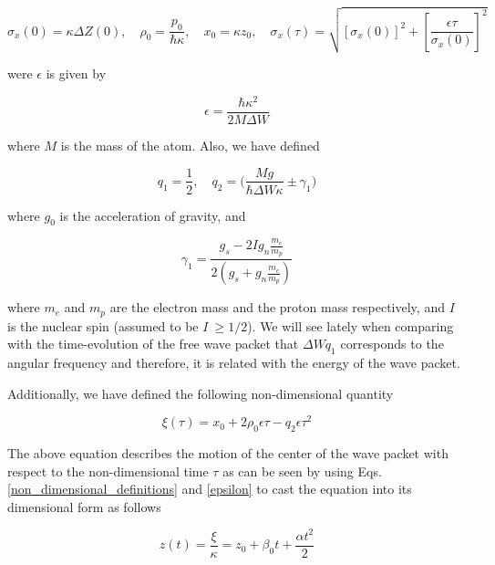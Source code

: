 \documentclass{article}
\begin{document}
\begin{equation}\label{non_dimensional_definitions}
\sigma_{x}(0) = \kappa \Delta Z(0)\mathrm{,}\quad \rho_{0}=\frac{p_{0}}{\hbar \kappa} \mathrm{,}\quad 
x_{0}=\kappa z_{0} \mathrm{,}\quad 
\sigma_{x}(\tau) = \sqrt{[\sigma_{x}(0)]^{2} + \left[\frac{\epsilon \tau}{\sigma_{x}(0)} \right]^{2}}
\end{equation}

were $\epsilon$ is given by 

\begin{equation}\label{epsilon}
\epsilon = \frac{\hbar \kappa^{2}}{2 M \Delta W}
\end{equation}

where $M$ is the mass of the atom. Also, we have defined

\begin{equation}\label{q1_q2}
q_{1} = \frac{1}{2} \mathrm{,}\quad q_{2} = \bigg(\frac{M g}{\hbar \Delta W \kappa} \pm  \gamma_{1} \bigg)
\end{equation}

where $g_{0}$ is the acceleration of gravity, and 

\begin{equation}\label{gamma_1}
\gamma_{1} = \frac{g_{s}-2 I g_{n} \frac{m_{e}}{m_{p}}}{2(g_{s}+g_{n}\frac{m_{e}}{m_{p}})}
\end{equation}

where $m_{e}$ and $m_{p}$ are the electron mass and the proton mass respectively, and $I$ is the nuclear spin (assumed to be $I\ \ge 1/2$).
We will see lately when comparing with the time-evolution of the free wave packet that $\Delta W q_{1}$ corresponds to the angular frequency and therefore, it is related with the energy of the wave packet.


Additionally, we have defined the following non-dimensional quantity

\begin{equation}\label{xi}
\xi(\tau) = x_{0} + 2 \rho_{0} \epsilon \tau - q_{2}\epsilon \tau^{2}
\end{equation}

The above equation describes the motion of the center of the wave packet with respect to the non-dimensional time $\tau$ as can be seen by using Eqs. \ref{non_dimensional_definitions} and \ref{epsilon} to cast the equation into its dimensional form as follows

\begin{equation}\label{xi_dimensional}
z(t) = \frac{\xi}{\kappa} = z_{0} +  \beta_{0} t +  \frac{\alpha t^{2}}{2}
\end{equation}
\end{document}
